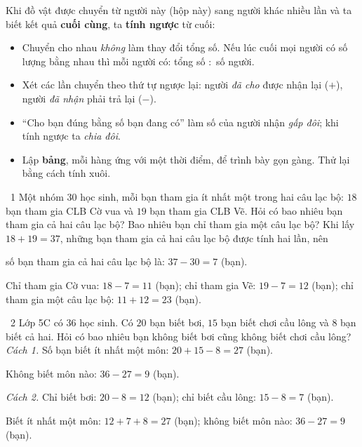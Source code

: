 \begin{knowbox}
Khi đồ vật được chuyển từ người này (hộp này) sang người khác nhiều lần và ta biết kết quả \textbf{cuối cùng}, ta \textbf{tính ngược} từ cuối:
\begin{itemize}[leftmargin=1.4em,itemsep=3pt]
\item Chuyển cho nhau \emph{không} làm thay đổi tổng số. Nếu lúc cuối mọi người có số lượng bằng nhau thì mỗi người có: tổng số $:$ số người.
\item Xét các lần chuyển theo thứ tự ngược lại: người \emph{đã cho} được nhận lại ($+$), người \emph{đã nhận} phải trả lại ($-$).
\item ``Cho bạn đúng bằng số bạn đang có'' làm số của người nhận \emph{gấp đôi}; khi tính ngược ta \emph{chia đôi}.
\item Lập \textbf{bảng}, mỗi hàng ứng với một thời điểm, để trình bày gọn gàng. Thử lại bằng cách tính xuôi.
\end{itemize}
\end{knowbox}
\gap
\begin{exbox}{\ExWord\ 1}
Một nhóm $30$ học sinh, mỗi bạn tham gia ít nhất một trong hai câu lạc bộ: $18$ bạn tham gia CLB Cờ vua và $19$ bạn tham gia CLB Vẽ. Hỏi có bao nhiêu bạn tham gia cả hai câu lạc bộ? Bao nhiêu bạn chỉ tham gia một câu lạc bộ?
\guide
Khi lấy $18+19=37$, những bạn tham gia cả hai câu lạc bộ được tính hai lần, nên
\par số bạn tham gia cả hai câu lạc bộ là: $37-30=7$ (bạn).\par
Chỉ tham gia Cờ vua: $18-7=11$ (bạn); chỉ tham gia Vẽ: $19-7=12$ (bạn); chỉ tham gia một câu lạc bộ: $11+12=23$ (bạn).
\begin{center}
\end{center}
\end{exbox}
\gap
\begin{exbox}{\ExWord\ 2}
Lớp 5C có $36$ học sinh. Có $20$ bạn biết bơi, $15$ bạn biết chơi cầu lông và $8$ bạn biết cả hai. Hỏi có bao nhiêu bạn không biết bơi cũng không biết chơi cầu lông?
\guide
\emph{Cách 1.} Số bạn biết ít nhất một môn: $20+15-8=27$ (bạn).\par Không biết môn nào: $36-27=9$ (bạn).\par
\emph{Cách 2.} Chỉ biết bơi: $20-8=12$ (bạn); chỉ biết cầu lông: $15-8=7$ (bạn).\par Biết ít nhất một môn: $12+7+8=27$ (bạn); không biết môn nào: $36-27=9$ (bạn).
\begin{center}
\end{center}
\end{exbox}

